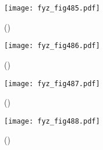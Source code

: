 {    \begin{figure}[ht!] %
      \centering
      \texttt{[image: fyz\_fig485.pdf]}
      \caption{ 
               (\cite[s.~707]{Feynman01})}
      \label{fyz_fig485}
    \end{figure}

    \begin{figure}[ht!] %
      \centering
      \texttt{[image: fyz\_fig486.pdf]}
      \caption{ 
               (\cite[s.~707]{Feynman01})}
      \label{fyz_fig486}
    \end{figure}

    \begin{figure}[ht!] %
      \centering
      \texttt{[image: fyz\_fig487.pdf]}
      \caption{ 
               (\cite[s.~707]{Feynman01})}
      \label{fyz_fig487}
    \end{figure}

    \begin{figure}[ht!] %
      \centering
      \texttt{[image: fyz\_fig488.pdf]}
      \caption{ 
               (\cite[s.~707]{Feynman01})}
      \label{fyz_fig488}
    \end{figure}
    
    
} %
\printbibliography[title={Seznam literatury}, heading=subbibliography]
